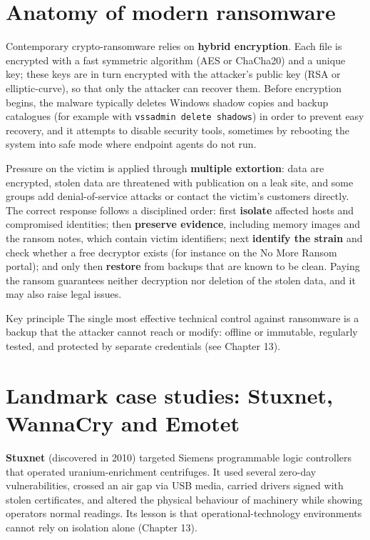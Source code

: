 \documentclass[11pt,openany]{book}
\begin{document}
\section{Anatomy of modern ransomware}\label{sec:4.5}
Contemporary crypto-ransomware relies on \textbf{hybrid encryption}. Each file is encrypted with a fast symmetric algorithm (AES or ChaCha20) and a unique key; these keys are in turn encrypted with the attacker's public key (RSA or elliptic-curve), so that only the attacker can recover them. Before encryption begins, the malware typically deletes Windows shadow copies and backup catalogues (for example with \texttt{vssadmin delete shadows}) in order to prevent easy recovery, and it attempts to disable security tools, sometimes by rebooting the system into safe mode where endpoint agents do not run.

Pressure on the victim is applied through \textbf{multiple extortion}: data are encrypted, stolen data are threatened with publication on a leak site, and some groups add denial-of-service attacks or contact the victim's customers directly. The correct response follows a disciplined order: first \textbf{isolate} affected hosts and compromised identities; then \textbf{preserve evidence}, including memory images and the ransom notes, which contain victim identifiers; next \textbf{identify the strain} and check whether a free decryptor exists (for instance on the No More Ransom portal); and only then \textbf{restore} from backups that are known to be clean. Paying the ransom guarantees neither decryption nor deletion of the stolen data, and it may also raise legal issues.

\begin{keybox}{Key principle}
The single most effective technical control against ransomware is a backup that the attacker cannot reach or modify: offline or immutable, regularly tested, and protected by separate credentials (see Chapter 13).
\end{keybox}

\section{Landmark case studies: Stuxnet, WannaCry and Emotet}\label{sec:4.6}
\textbf{Stuxnet} (discovered in 2010) targeted Siemens programmable logic controllers that operated uranium-enrichment centrifuges. It used several zero-day vulnerabilities, crossed an air gap via USB media, carried drivers signed with stolen certificates, and altered the physical behaviour of machinery while showing operators normal readings. Its lesson is that operational-technology environments cannot rely on isolation alone (Chapter 13).
\end{document}
